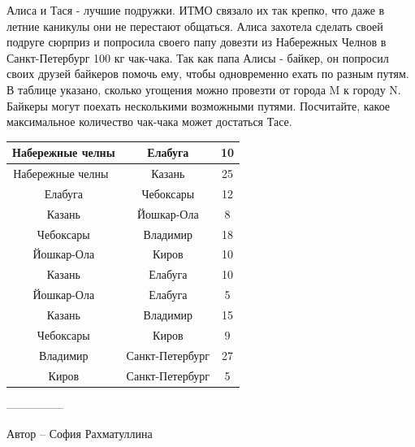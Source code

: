 \question
Алиса и Тася - лучшие подружки. ИТМО связало их так крепко, что даже в летние каникулы они не перестают общаться. Алиса захотела сделать своей подруге сюрприз и попросила своего папу довезти из Набережных Челнов в Санкт-Петербург 100 кг чак-чака. Так как папа Алисы - байкер, он попросил своих друзей байкеров помочь ему, чтобы одновременно ехать по разным путям. В таблице указано, сколько угощения можно провезти от города M к городу N. Байкеры могут поехать несколькими возможными путями. Посчитайте, какое максимальное количество чак-чака может достаться Тасе.

\begin{center}
\begin{tabular}{| c | c | c |}
\hline
Набережные челны & Елабуга & 10 \\
\hline
Набережные челны  & Казань & 25 \\
\hline
Елабуга & Чебоксары & 12 \\
\hline
Казань & Йошкар-Ола & 8 \\
\hline
Чебоксары & Владимир & 18 \\
\hline
Йошкар-Ола & Киров & 10 \\
\hline
Казань& Елабуга & 10\\
\hline
Йошкар-Ола & Елабуга & 5\\
\hline
 Казань& Владимир &15\\\hline
 Чебоксары & Киров&9\\\hline
 Владимир & Санкт-Петербург &27 \\\hline
 Киров & Санкт-Петербург &5 \\\hline

\end{tabular}
\end{center}

---------------

Автор -- София Рахматуллина